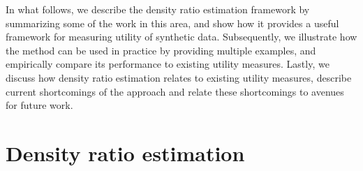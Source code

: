 \documentclass[
]{template/style/uneceart}
\begin{document}
In what follows, we describe the density ratio estimation framework by
summarizing some of the work in this area, and show how it provides a
useful framework for measuring utility of synthetic data. Subsequently,
we illustrate how the method can be used in practice by providing
multiple examples, and empirically compare its performance to existing
utility measures. Lastly, we discuss how density ratio estimation
relates to existing utility measures, describe current shortcomings of
the approach and relate these shortcomings to avenues for future work.

\hypertarget{density-ratio-estimation}{%
\section{Density ratio estimation}\label{density-ratio-estimation}}
\end{document}
